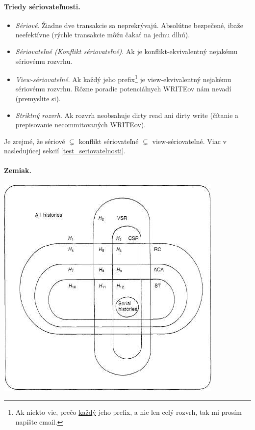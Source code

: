 \documentclass[10pt,a4paper]{article}
\begin{document}
\paragraph{Triedy sériovateľnosti.}
\begin{itemize}
\item \emph{Sériové}. Žiadne dve transakcie sa neprekrývajú. Absolútne bezpečené, ibaže neefektívne (rýchle transakcie môžu čakať na jednu dlhú).
\item \emph{Sériovateľné (Konflikt sériovateľné)}. Ak je konflikt-ekvivalentný nejakému sériovému rozvrhu. 
\item \emph{View-sériovateľné}. Ak každý jeho prefix\footnote{Ak niekto vie, prečo \underline{každý} jeho prefix, a nie len celý rozvrh, tak mi prosím napíšte email.} je view-ekvivalentný nejakému sériovému rozvrhu. Rôzne poradie potenciálnych WRITEov nám nevadí (premyslite si). 
\item \emph{Striktný rozvrh}. Ak rozvrh neobsahuje dirty read ani dirty write (čítanie a prepisovanie necommitovaných WRITEov). 
\end{itemize}

Je zrejmé, že sériové $\subsetneq$ konflikt sériovateľné $\subsetneq$ view-sériovateľné.
Viac v nasledujúcej sekcií \ref{test_seriovatelnosti}.

\paragraph{Zemiak.}
\begin{center}
\includegraphics[scale=0.5]{db_triedy_seriovatelnosti.png}
\end{center}
    
\end{document}
